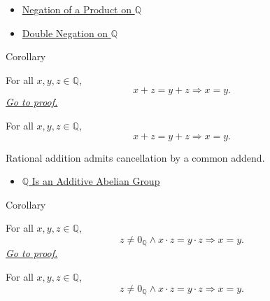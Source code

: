 \begin{dependencies}
\begin{itemize}
  \item \hyperref[cor:negation-of-product-on-q]{Negation of a Product on $\mathbb{Q}$}
  \item \hyperref[cor:double-negation-on-q]{Double Negation on $\mathbb{Q}$}
\end{itemize}
\end{dependencies}

\begin{corollarybox}{Corollary}
\begin{corollary}
\label{cor:additive-cancellation-on-q}
For all $x,y,z\in\mathbb{Q}$,
\[
x+z=y+z
\Longrightarrow
x=y.
\]
\hyperref[prf:additive-cancellation-on-q]{\textit{Go to proof.}}
\end{corollary}
\end{corollarybox}

\begin{remark*}
For all $x,y,z\in\mathbb{Q}$,
\[
x+z=y+z\Longrightarrow x=y.
\]
\end{remark*}

\begin{remark*}[Interpretation]
Rational addition admits cancellation by a common addend.
\end{remark*}

\begin{dependencies}
\begin{itemize}
  \item \hyperref[thm:q-additive-abelian-group]{$\mathbb{Q}$ Is an Additive Abelian Group}
\end{itemize}
\end{dependencies}

\begin{corollarybox}{Corollary}
\begin{corollary}
\label{cor:multiplicative-cancellation-on-q}
For all $x,y,z\in\mathbb{Q}$,
\[
z\ne 0_{\mathbb{Q}}\land x\cdot z=y\cdot z
\Longrightarrow
x=y.
\]
\hyperref[prf:multiplicative-cancellation-on-q]{\textit{Go to proof.}}
\end{corollary}
\end{corollarybox}

\begin{remark*}
For all $x,y,z\in\mathbb{Q}$,
\[
z\ne 0_{\mathbb{Q}}\land x\cdot z=y\cdot z
\Longrightarrow
x=y.
\]
\end{remark*}

